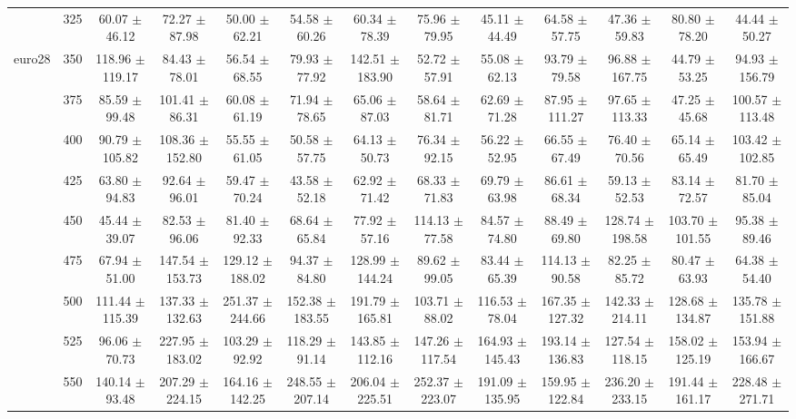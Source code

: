 \begin{table}[h]
{\begin{tabular}{
        ccccccccccccc}
 & 325& 60.07 $\pm$ 46.12& 72.27 $\pm$ 87.98& 50.00 $\pm$ 62.21& 54.58 $\pm$ 60.26& 60.34 $\pm$ 78.39& 75.96 $\pm$ 79.95& 45.11 $\pm$ 44.49& 64.58 $\pm$ 57.75& 47.36 $\pm$ 59.83& 80.80 $\pm$ 78.20& 44.44 $\pm$ 50.27 \\ 
\multirow{4}{*}{euro28}& 350& 118.96 $\pm$ 119.17& 84.43 $\pm$ 78.01& 56.54 $\pm$ 68.55& 79.93 $\pm$ 77.92& 142.51 $\pm$ 183.90& 52.72 $\pm$ 57.91& 55.08 $\pm$ 62.13& 93.79 $\pm$ 79.58& 96.88 $\pm$ 167.75& 44.79 $\pm$ 53.25& 94.93 $\pm$ 156.79 \\ 
 & 375& 85.59 $\pm$ 99.48& 101.41 $\pm$ 86.31& 60.08 $\pm$ 61.19& 71.94 $\pm$ 78.65& 65.06 $\pm$ 87.03& 58.64 $\pm$ 81.71& 62.69 $\pm$ 71.28& 87.95 $\pm$ 111.27& 97.65 $\pm$ 113.33& 47.25 $\pm$ 45.68& 100.57 $\pm$ 113.48 \\ 
 & 400& 90.79 $\pm$ 105.82& 108.36 $\pm$ 152.80& 55.55 $\pm$ 61.05& 50.58 $\pm$ 57.75& 64.13 $\pm$ 50.73& 76.34 $\pm$ 92.15& 56.22 $\pm$ 52.95& 66.55 $\pm$ 67.49& 76.40 $\pm$ 70.56& 65.14 $\pm$ 65.49& 103.42 $\pm$ 102.85 \\ 
 & 425& 63.80 $\pm$ 94.83& 92.64 $\pm$ 96.01& 59.47 $\pm$ 70.24& 43.58 $\pm$ 52.18& 62.92 $\pm$ 71.42& 68.33 $\pm$ 71.83& 69.79 $\pm$ 63.98& 86.61 $\pm$ 68.34& 59.13 $\pm$ 52.53& 83.14 $\pm$ 72.57& 81.70 $\pm$ 85.04 \\ 
 & 450& 45.44 $\pm$ 39.07& 82.53 $\pm$ 96.06& 81.40 $\pm$ 92.33& 68.64 $\pm$ 65.84& 77.92 $\pm$ 57.16& 114.13 $\pm$ 77.58& 84.57 $\pm$ 74.80& 88.49 $\pm$ 69.80& 128.74 $\pm$ 198.58& 103.70 $\pm$ 101.55& 95.38 $\pm$ 89.46 \\ 
 & 475& 67.94 $\pm$ 51.00& 147.54 $\pm$ 153.73& 129.12 $\pm$ 188.02& 94.37 $\pm$ 84.80& 128.99 $\pm$ 144.24& 89.62 $\pm$ 99.05& 83.44 $\pm$ 65.39& 114.13 $\pm$ 90.58& 82.25 $\pm$ 85.72& 80.47 $\pm$ 63.93& 64.38 $\pm$ 54.40 \\ 
 & 500& 111.44 $\pm$ 115.39& 137.33 $\pm$ 132.63& 251.37 $\pm$ 244.66& 152.38 $\pm$ 183.55& 191.79 $\pm$ 165.81& 103.71 $\pm$ 88.02& 116.53 $\pm$ 78.04& 167.35 $\pm$ 127.32& 142.33 $\pm$ 214.11& 128.68 $\pm$ 134.87& 135.78 $\pm$ 151.88 \\ 
 & 525& 96.06 $\pm$ 70.73& 227.95 $\pm$ 183.02& 103.29 $\pm$ 92.92& 118.29 $\pm$ 91.14& 143.85 $\pm$ 112.16& 147.26 $\pm$ 117.54& 164.93 $\pm$ 145.43& 193.14 $\pm$ 136.83& 127.54 $\pm$ 118.15& 158.02 $\pm$ 125.19& 153.94 $\pm$ 166.67 \\ 
 & 550& 140.14 $\pm$ 93.48& 207.29 $\pm$ 224.15& 164.16 $\pm$ 142.25& 248.55 $\pm$ 207.14& 206.04 $\pm$ 225.51& 252.37 $\pm$ 223.07& 191.09 $\pm$ 135.95& 159.95 $\pm$ 122.84& 236.20 $\pm$ 233.15& 191.44 $\pm$ 161.17& 228.48 $\pm$ 271.71 \\ 

\end{tabular}}
\end{table}
